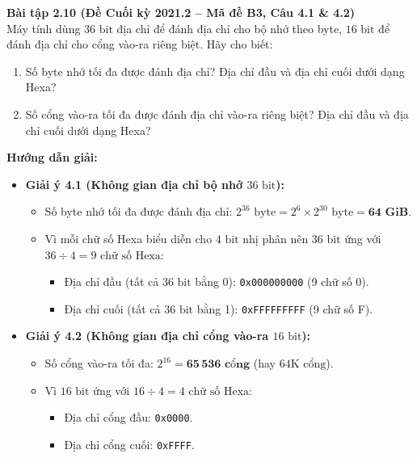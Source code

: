 \textbf{Bài tập 2.10 (Đề Cuối kỳ 2021.2 -- Mã đề B3, Câu 4.1 \& 4.2)}\\
Máy tính dùng $36\text{ bit}$ địa chỉ để đánh địa chỉ cho bộ nhớ theo byte, $16\text{ bit}$ để đánh địa chỉ cho cổng vào-ra riêng biệt. Hãy cho biết:
\begin{enumerate}[label=4.\arabic*.]
    \item Số byte nhớ tối đa được đánh địa chỉ? Địa chỉ đầu và địa chỉ cuối dưới dạng Hexa?
    \item Số cổng vào-ra tối đa được đánh địa chỉ vào-ra riêng biệt? Địa chỉ đầu và địa chỉ cuối dưới dạng Hexa?
\end{enumerate}
\textbf{Hướng dẫn giải:}
\begin{itemize}
    \item \textbf{Giải ý 4.1 (Không gian địa chỉ bộ nhớ $36\text{ bit}$):}
    \begin{itemize}
        \item Số byte nhớ tối đa được đánh địa chỉ: $2^{36}\text{ byte} = 2^6 \times 2^{30}\text{ byte} = \mathbf{64\text{ GiB}}$.
        \item Vì mỗi chữ số Hexa biểu diễn cho $4\text{ bit}$ nhị phân nên $36\text{ bit}$ ứng với $36 \div 4 = 9\text{ chữ số Hexa}$:
        \begin{itemize}
            \item Địa chỉ đầu (tất cả $36\text{ bit}$ bằng 0): \texttt{0x000000000} (9 chữ số 0).
            \item Địa chỉ cuối (tất cả $36\text{ bit}$ bằng 1): \texttt{0xFFFFFFFFF} (9 chữ số F).
        \end{itemize}
    \end{itemize}
    \item \textbf{Giải ý 4.2 (Không gian địa chỉ cổng vào-ra $16\text{ bit}$):}
    \begin{itemize}
        \item Số cổng vào-ra tối đa: $2^{16} = \mathbf{65\,536\text{ cổng}}$ (hay $64\text{K cổng}$).
        \item Vì $16\text{ bit}$ ứng với $16 \div 4 = 4\text{ chữ số Hexa}$:
        \begin{itemize}
            \item Địa chỉ cổng đầu: \texttt{0x0000}.
            \item Địa chỉ cổng cuối: \texttt{0xFFFF}.
        \end{itemize}
    \end{itemize}
\end{itemize}